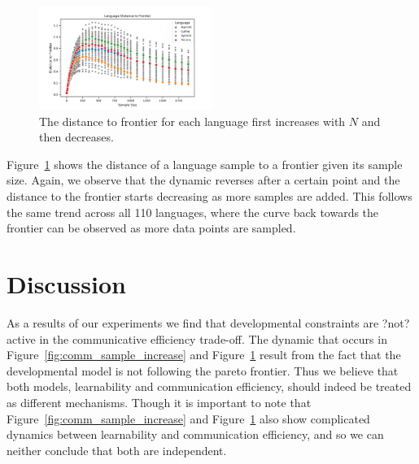 \documentclass[11pt]{article}
\begin{document}
\begin{figure}[h]
    \centering
    \includegraphics[width=0.5\textwidth]{docs/final_report_for_course/graphs/dist_frontier.png}
    \caption{The distance to frontier for each language first increases with $N$ and then decreases.}
    \label{fig:dist_frontier}
\end{figure}


Figure~\ref{fig:dist_frontier} shows the distance of a language sample to a frontier given its sample size.
Again, we observe that the dynamic reverses after a certain point and the distance to the frontier starts decreasing as more samples are added.
This follows the same trend across all 110 languages, where the curve back towards the frontier can be observed as more data points are sampled.



\section{Discussion}

As a results of our experiments we find that developmental constraints are ?not? active in the communicative efficiency trade-off. 
The dynamic that occurs in Figure~\ref{fig:comm_sample_increase} and Figure~\ref{fig:dist_frontier} result from the fact that the developmental model is not following the pareto frontier.
Thus we believe that both models, learnability and communication efficiency, should indeed be treated as different mechanisms. 
Though it is important to note that Figure~\ref{fig:comm_sample_increase} and Figure~\ref{fig:dist_frontier}  also show complicated dynamics between learnability and communication efficiency, and so we can neither conclude that both are independent. 




\end{document}
